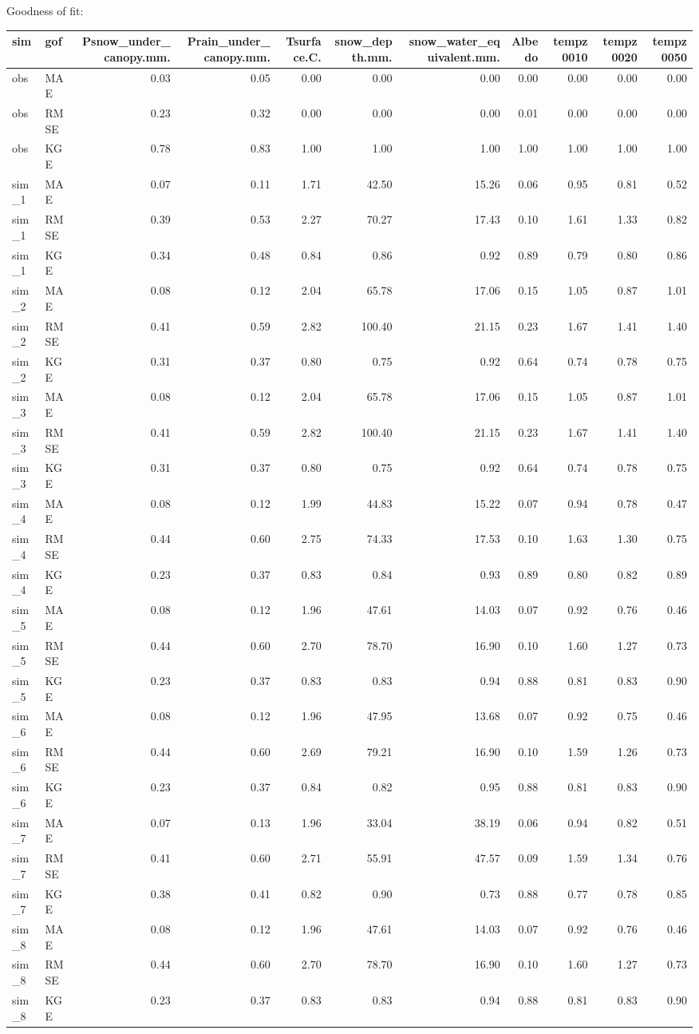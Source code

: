 \documentclass[
]{article}
\begin{document}
Goodness of fit:

\begin{longtable}[]{@{}llrrrrrrrrr@{}}
\toprule
sim & gof & Psnow\_under\_canopy.mm. & Prain\_under\_canopy.mm. &
Tsurface.C. & snow\_depth.mm. & snow\_water\_equivalent.mm. & Albedo &
tempz0010 & tempz0020 & tempz0050\tabularnewline
\midrule
\endhead
obs & MAE & 0.03 & 0.05 & 0.00 & 0.00 & 0.00 & 0.00 & 0.00 & 0.00 &
0.00\tabularnewline
obs & RMSE & 0.23 & 0.32 & 0.00 & 0.00 & 0.00 & 0.01 & 0.00 & 0.00 &
0.00\tabularnewline
obs & KGE & 0.78 & 0.83 & 1.00 & 1.00 & 1.00 & 1.00 & 1.00 & 1.00 &
1.00\tabularnewline
sim\_1 & MAE & 0.07 & 0.11 & 1.71 & 42.50 & 15.26 & 0.06 & 0.95 & 0.81 &
0.52\tabularnewline
sim\_1 & RMSE & 0.39 & 0.53 & 2.27 & 70.27 & 17.43 & 0.10 & 1.61 & 1.33
& 0.82\tabularnewline
sim\_1 & KGE & 0.34 & 0.48 & 0.84 & 0.86 & 0.92 & 0.89 & 0.79 & 0.80 &
0.86\tabularnewline
sim\_2 & MAE & 0.08 & 0.12 & 2.04 & 65.78 & 17.06 & 0.15 & 1.05 & 0.87 &
1.01\tabularnewline
sim\_2 & RMSE & 0.41 & 0.59 & 2.82 & 100.40 & 21.15 & 0.23 & 1.67 & 1.41
& 1.40\tabularnewline
sim\_2 & KGE & 0.31 & 0.37 & 0.80 & 0.75 & 0.92 & 0.64 & 0.74 & 0.78 &
0.75\tabularnewline
sim\_3 & MAE & 0.08 & 0.12 & 2.04 & 65.78 & 17.06 & 0.15 & 1.05 & 0.87 &
1.01\tabularnewline
sim\_3 & RMSE & 0.41 & 0.59 & 2.82 & 100.40 & 21.15 & 0.23 & 1.67 & 1.41
& 1.40\tabularnewline
sim\_3 & KGE & 0.31 & 0.37 & 0.80 & 0.75 & 0.92 & 0.64 & 0.74 & 0.78 &
0.75\tabularnewline
sim\_4 & MAE & 0.08 & 0.12 & 1.99 & 44.83 & 15.22 & 0.07 & 0.94 & 0.78 &
0.47\tabularnewline
sim\_4 & RMSE & 0.44 & 0.60 & 2.75 & 74.33 & 17.53 & 0.10 & 1.63 & 1.30
& 0.75\tabularnewline
sim\_4 & KGE & 0.23 & 0.37 & 0.83 & 0.84 & 0.93 & 0.89 & 0.80 & 0.82 &
0.89\tabularnewline
sim\_5 & MAE & 0.08 & 0.12 & 1.96 & 47.61 & 14.03 & 0.07 & 0.92 & 0.76 &
0.46\tabularnewline
sim\_5 & RMSE & 0.44 & 0.60 & 2.70 & 78.70 & 16.90 & 0.10 & 1.60 & 1.27
& 0.73\tabularnewline
sim\_5 & KGE & 0.23 & 0.37 & 0.83 & 0.83 & 0.94 & 0.88 & 0.81 & 0.83 &
0.90\tabularnewline
sim\_6 & MAE & 0.08 & 0.12 & 1.96 & 47.95 & 13.68 & 0.07 & 0.92 & 0.75 &
0.46\tabularnewline
sim\_6 & RMSE & 0.44 & 0.60 & 2.69 & 79.21 & 16.90 & 0.10 & 1.59 & 1.26
& 0.73\tabularnewline
sim\_6 & KGE & 0.23 & 0.37 & 0.84 & 0.82 & 0.95 & 0.88 & 0.81 & 0.83 &
0.90\tabularnewline
sim\_7 & MAE & 0.07 & 0.13 & 1.96 & 33.04 & 38.19 & 0.06 & 0.94 & 0.82 &
0.51\tabularnewline
sim\_7 & RMSE & 0.41 & 0.60 & 2.71 & 55.91 & 47.57 & 0.09 & 1.59 & 1.34
& 0.76\tabularnewline
sim\_7 & KGE & 0.38 & 0.41 & 0.82 & 0.90 & 0.73 & 0.88 & 0.77 & 0.78 &
0.85\tabularnewline
sim\_8 & MAE & 0.08 & 0.12 & 1.96 & 47.61 & 14.03 & 0.07 & 0.92 & 0.76 &
0.46\tabularnewline
sim\_8 & RMSE & 0.44 & 0.60 & 2.70 & 78.70 & 16.90 & 0.10 & 1.60 & 1.27
& 0.73\tabularnewline
sim\_8 & KGE & 0.23 & 0.37 & 0.83 & 0.83 & 0.94 & 0.88 & 0.81 & 0.83 &
0.90\tabularnewline
\bottomrule
\end{longtable}
\end{document}
